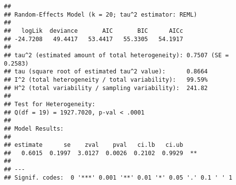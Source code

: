 \documentclass[
]{book}
\newenvironment{Shaded}{\begin{snugshade}}{\end{snugshade}}
\newcommand{\AttributeTok}[1]{\textcolor[rgb]{0.77,0.63,0.00}{#1}}
\newcommand{\CommentTok}[1]{\textcolor[rgb]{0.56,0.35,0.01}{\textit{#1}}}
\newcommand{\FloatTok}[1]{\textcolor[rgb]{0.00,0.00,0.81}{#1}}
\newcommand{\FunctionTok}[1]{\textcolor[rgb]{0.00,0.00,0.00}{#1}}
\newcommand{\NormalTok}[1]{#1}
\newcommand{\OtherTok}[1]{\textcolor[rgb]{0.56,0.35,0.01}{#1}}
\newcommand{\SpecialCharTok}[1]{\textcolor[rgb]{0.00,0.00,0.00}{#1}}
\theoremstyle{definition}
\theoremstyle{definition}
\theoremstyle{definition}
\theoremstyle{definition}
\theoremstyle{remark}
\begin{document}
\begin{Shaded}
\end{Shaded}

\begin{verbatim}
## 
## Random-Effects Model (k = 20; tau^2 estimator: REML)
## 
##   logLik  deviance       AIC       BIC      AICc 
## -24.7208   49.4417   53.4417   55.3305   54.1917   
## 
## tau^2 (estimated amount of total heterogeneity): 0.7507 (SE = 0.2583)
## tau (square root of estimated tau^2 value):      0.8664
## I^2 (total heterogeneity / total variability):   99.59%
## H^2 (total variability / sampling variability):  241.82
## 
## Test for Heterogeneity:
## Q(df = 19) = 1927.7020, p-val < .0001
## 
## Model Results:
## 
## estimate      se    zval    pval   ci.lb   ci.ub 
##   0.6015  0.1997  3.0127  0.0026  0.2102  0.9929  ** 
## 
## ---
## Signif. codes:  0 '***' 0.001 '**' 0.01 '*' 0.05 '.' 0.1 ' ' 1
\end{verbatim}
\end{document}
